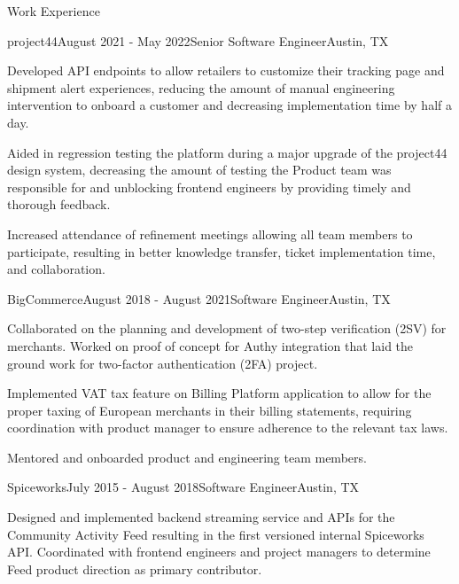 \documentclass{resume} %
\begin{document}

\begin{rSection}{Work Experience}


\begin{rSubsection}{project44}{August 2021 - May 2022}{Senior Software Engineer}{Austin, TX}
\item Developed API endpoints to allow retailers to customize their tracking page and shipment alert experiences, reducing the
amount of manual engineering intervention to onboard a customer and decreasing implementation time by half a day.
\item Aided in regression testing the platform during a major upgrade of the project44 design system, decreasing the amount of
testing the Product team was responsible for and unblocking frontend engineers by providing timely and thorough feedback.
\item Increased attendance of refinement meetings allowing all team members to participate, resulting in better knowledge transfer,
ticket implementation time, and collaboration.
\end{rSubsection}


\begin{rSubsection}{BigCommerce}{August 2018 - August 2021}{Software Engineer}{Austin, TX}
\item Collaborated on the planning and development of two-step verification (2SV) for merchants. Worked on proof of concept for
Authy integration that laid the ground work for two-factor authentication (2FA) project.
\item Implemented VAT tax feature on Billing Platform application to allow for the proper taxing of European merchants in their billing
statements, requiring coordination with product manager to ensure adherence to the relevant tax laws.
\item Mentored and onboarded product and engineering team members.
\end{rSubsection}


\begin{rSubsection}{Spiceworks}{July 2015 - August 2018}{Software Engineer}{Austin, TX}
\item Designed and implemented backend streaming service and APIs for the Community Activity Feed resulting in the first versioned internal
Spiceworks API. Coordinated with frontend engineers and project managers to determine Feed product direction as primary contributor.
\end{rSubsection}

\end{rSection}
\end{document}
